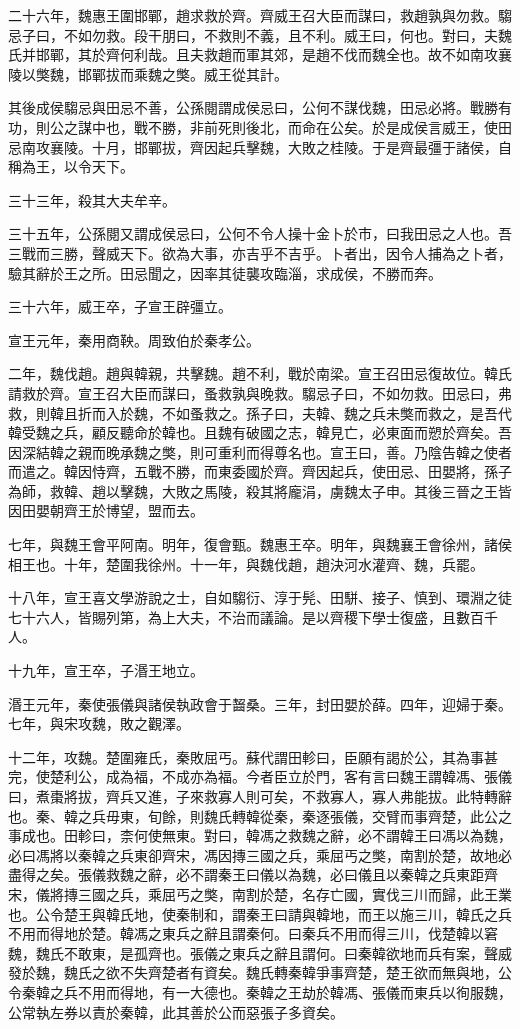 二十六年，魏惠王圍邯鄲，趙求救於齊。齊威王召大臣而謀曰，救趙孰與勿救。騶忌子曰，不如勿救。段干朋曰，不救則不義，且不利。威王曰，何也。對曰，夫魏氏并邯鄲，其於齊何利哉。且夫救趙而軍其郊，是趙不伐而魏全也。故不如南攻襄陵以獘魏，邯鄲拔而乘魏之獘。威王從其計。

其後成侯騶忌與田忌不善，公孫閱謂成侯忌曰，公何不謀伐魏，田忌必將。戰勝有功，則公之謀中也，戰不勝，非前死則後北，而命在公矣。於是成侯言威王，使田忌南攻襄陵。十月，邯鄲拔，齊因起兵擊魏，大敗之桂陵。于是齊最彊于諸侯，自稱為王，以令天下。

三十三年，殺其大夫牟辛。

三十五年，公孫閱又謂成侯忌曰，公何不令人操十金卜於市，曰我田忌之人也。吾三戰而三勝，聲威天下。欲為大事，亦吉乎不吉乎。卜者出，因令人捕為之卜者，驗其辭於王之所。田忌聞之，因率其徒襲攻臨淄，求成侯，不勝而奔。

三十六年，威王卒，子宣王辟彊立。

宣王元年，秦用商鞅。周致伯於秦孝公。

二年，魏伐趙。趙與韓親，共擊魏。趙不利，戰於南梁。宣王召田忌復故位。韓氏請救於齊。宣王召大臣而謀曰，蚤救孰與晚救。騶忌子曰，不如勿救。田忌曰，弗救，則韓且折而入於魏，不如蚤救之。孫子曰，夫韓、魏之兵未獘而救之，是吾代韓受魏之兵，顧反聽命於韓也。且魏有破國之志，韓見亡，必東面而愬於齊矣。吾因深結韓之親而晚承魏之獘，則可重利而得尊名也。宣王曰，善。乃陰告韓之使者而遣之。韓因恃齊，五戰不勝，而東委國於齊。齊因起兵，使田忌、田嬰將，孫子為師，救韓、趙以擊魏，大敗之馬陵，殺其將龐涓，虜魏太子申。其後三晉之王皆因田嬰朝齊王於博望，盟而去。

七年，與魏王會平阿南。明年，復會甄。魏惠王卒。明年，與魏襄王會徐州，諸侯相王也。十年，楚圍我徐州。十一年，與魏伐趙，趙決河水灌齊、魏，兵罷。

十八年，宣王喜文學游說之士，自如騶衍、淳于髡、田駢、接子、慎到、環淵之徒七十六人，皆賜列第，為上大夫，不治而議論。是以齊稷下學士復盛，且數百千人。

十九年，宣王卒，子湣王地立。

湣王元年，秦使張儀與諸侯執政會于齧桑。三年，封田嬰於薛。四年，迎婦于秦。七年，與宋攻魏，敗之觀澤。

十二年，攻魏。楚圍雍氏，秦敗屈丐。蘇代謂田軫曰，臣願有謁於公，其為事甚完，使楚利公，成為福，不成亦為福。今者臣立於門，客有言曰魏王謂韓馮、張儀曰，煮棗將拔，齊兵又進，子來救寡人則可矣，不救寡人，寡人弗能拔。此特轉辭也。秦、韓之兵毋東，旬餘，則魏氏轉韓從秦，秦逐張儀，交臂而事齊楚，此公之事成也。田軫曰，柰何使無東。對曰，韓馮之救魏之辭，必不謂韓王曰馮以為魏，必曰馮將以秦韓之兵東卻齊宋，馮因摶三國之兵，乘屈丐之獘，南割於楚，故地必盡得之矣。張儀救魏之辭，必不謂秦王曰儀以為魏，必曰儀且以秦韓之兵東距齊宋，儀將摶三國之兵，乘屈丐之獘，南割於楚，名存亡國，實伐三川而歸，此王業也。公令楚王與韓氏地，使秦制和，謂秦王曰請與韓地，而王以施三川，韓氏之兵不用而得地於楚。韓馮之東兵之辭且謂秦何。曰秦兵不用而得三川，伐楚韓以窘魏，魏氏不敢東，是孤齊也。張儀之東兵之辭且謂何。曰秦韓欲地而兵有案，聲威發於魏，魏氏之欲不失齊楚者有資矣。魏氏轉秦韓爭事齊楚，楚王欲而無與地，公令秦韓之兵不用而得地，有一大德也。秦韓之王劫於韓馮、張儀而東兵以徇服魏，公常執左券以責於秦韓，此其善於公而惡張子多資矣。

